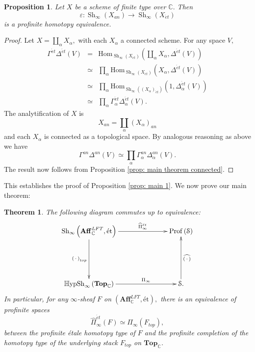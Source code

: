 \documentclass[12pt]{amsart}
\newtheorem{theorem}[dummy]{Theorem}
\newtheorem{proposition}[dummy]{Proposition}
\theoremstyle{definition}
\newcommand{\bC}{\mathbb{C}}
\newcommand{\cS}{\mathcal{S}}
\newcommand{\Aff}{\mathbf{Aff}^{\mathit{LFT}}_{\mathbb{C}}}
\newcommand{\TopC}{\Top_\mathbb{C}}
\newcommand{\Sh}{\operatorname{Sh}}
\newcommand{\Hom}{\mathrm{Hom}}
\newcommand{\et}{\acute{e}t}
\def\Top{\mathbf{Top}}
\renewcommand{\i}{\infty}
\def\Shi{\Sh_\i}
\def\Hshi{\mathbb{H}\mathrm{ypSh}_\i}
\def\blank{\mspace{3mu}\cdot\mspace{3mu}}
\def\Profs{\operatorname{Prof}\left(\cS\right)}
\def\Top{\mathbf{Top}}
\begin{document}
\begin{proposition}
Let $X$ be a scheme of finite type over $\bC.$ Then $$\varepsilon:\Shi\left(X_{an}\right) \to \Shi\left(X_{\et}\right)$$ is a profinite homotopy equivalence.
\end{proposition}

\begin{proof}
Let $X=\underset{\alpha} \coprod X_{\alpha},$ with each $X_{\alpha}$ a connected scheme. For any space $V,$ 
\begin{eqnarray*}
\Gamma^{\et}\Delta^{\et}\left(V\right)&=& \Hom_{\Shi\left(X_{\et}\right)}\left(\underset{\alpha}\coprod X_{\alpha},\Delta^{\et}\left(V\right)\right)\\
&\simeq&\underset{\alpha} \prod \Hom_{\Shi\left(X_{\et}\right)}\left(X_{\alpha},\Delta^{\et}\left(V\right)\right)\\
&\simeq& \underset{\alpha} \prod \Hom_{\Shi\left(\left(X_\alpha\right)_{\et}\right)}\left(1,\Delta_\alpha^{\et}\left(V\right)\right)\\
&\simeq & \underset{\alpha} \prod \Gamma_\alpha^{\et}\Delta_\alpha^{\et}\left(V\right).
\end{eqnarray*}
The analytification of $X$ is $$X_{an}=\underset{\alpha} \coprod \left(X_{\alpha}\right)_{an}$$ and each $X_{\alpha}$ is connected as a topological space. By analogous reasoning as above we have $$\Gamma^{an}\Delta^{an}\left(V\right) \simeq \underset{\alpha} \prod \Gamma_\alpha^{an}\Delta_\alpha^{an}\left(V\right).$$ The result now follows from Proposition \ref{prop: main theorem connected}.
\end{proof}

This establishes the proof of Proposition \ref{prop: main 1}. We now prove our main theorem:

\begin{theorem}\label{thm: main}
The following diagram commutes up to equivalence:
$$\xymatrix@C=2.5cm@R=2cm{\Shi\left(\Aff,\mbox{\'et}\right) \ar[r]^-{\widehat{\Pi}^{\et}_\i} \ar[d]_-{\left(\blank\right)_{top}} & \Profs\\
\Hshi\left(\TopC\right) \ar[r]^-{\Pi_\i} & \cS. \ar[u]_-{\widehat{\left(\blank\right)}}}$$
In particular, for any $\i$-sheaf $F$ on $\left(\Aff,\mbox{\'et}\right),$ there is an equivalence of profinite spaces $$\widehat{\Pi}^{\et}_\i\left(F\right) \simeq \widehat{\Pi}_\i\left(F_{top}\right),$$ between the profinite \'etale homotopy type of $F$ and the profinite completion of the homotopy type of the underlying stack $F_{top}$ on $\TopC$.
\end{theorem}
\end{document}
